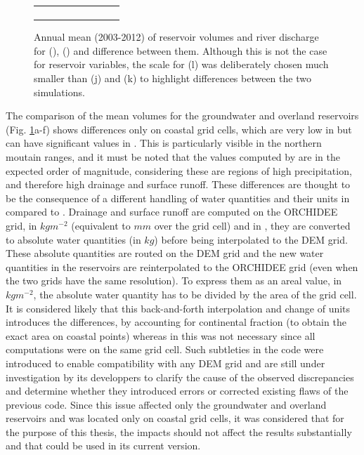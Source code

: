 \begin{figure}[htbp]
\begin{tabular}{ccc}
\begin{subfigure}[b]{0.33\textwidth}
        \end{subfigure} \\
    \end{tabular}
    \caption{Annual mean (2003-2012) of reservoir volumes and river discharge for \std (\noirr), \native (\noirr) and difference between them. 
    Although this is not the case for reservoir variables, the scale for (l) was deliberately chosen much smaller than (j) and (k) to highlight differences between the two simulations.}
    \label{fig:routing_reservoirs_halfdeg}
\end{figure}

The comparison of the mean volumes for the groundwater and overland reservoirs (Fig. \ref{fig:routing_reservoirs_halfdeg}a-f) shows differences only on coastal grid cells, which are very low in \std but can have significant values in \native. This is particularly visible in the northern moutain ranges, and it must be noted that the values computed by \native are in the expected order of magnitude, considering these are regions of high precipitation, and therefore high drainage and surface runoff.
These differences are thought to be the consequence of a different handling of water quantities and their units in \native compared to \std. Drainage and surface runoff are computed on the ORCHIDEE grid, in $kg m^{-2}$ (equivalent to $mm$ over the grid cell) and in \native, they are  converted to absolute water quantities (in $kg$) before being interpolated to the DEM grid. These absolute quantities are routed on the DEM grid and the new water quantities in the reservoirs are reinterpolated to the ORCHIDEE grid (even when the two grids have the same resolution). 
To express them as an areal value, in $kg m^{-2}$, the absolute water quantity has to be divided by the area of the grid cell. It is considered likely that this back-and-forth interpolation and change of units introduces the differences, by accounting for continental fraction (to obtain the exact area on coastal points) whereas in \std this was not necessary since all computations were on the same grid cell. Such subtleties in the code were introduced to enable compatibility with any DEM grid and are still under investigation by its developpers to clarify the cause of the observed discrepancies and determine whether they introduced errors or corrected existing flaws of the previous code.
Since this issue affected only the groundwater and overland reservoirs and was located only on coastal grid cells, it was considered that for the purpose of this thesis, the impacts should not affect the results substantially and that \native could be used in its current version.

